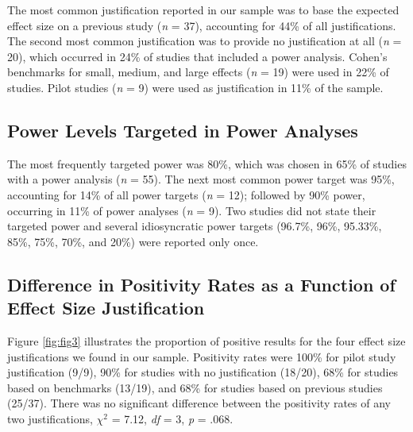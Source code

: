 \documentclass[
  man, donotrepeattitle,mask,floatsintext]{apa7}
\begin{document}
The most common justification reported in our sample was to base the expected effect size on a previous study (\emph{n} = 37), accounting for 44\% of all justifications. The second most common justification was to provide no justification at all (\emph{n} = 20), which occurred in 24\% of studies that included a power analysis. Cohen's benchmarks for small, medium, and large effects (\emph{n} = 19) were used in 22\% of studies. Pilot studies (\emph{n} = 9) were used as justification in 11\% of the sample.

\hypertarget{power-levels-targeted-in-power-analyses}{%
\subsection{Power Levels Targeted in Power Analyses}\label{power-levels-targeted-in-power-analyses}}

The most frequently targeted power was 80\%, which was chosen in 65\% of studies with a power analysis (\emph{n} = 55). The next most common power target was 95\%, accounting for 14\% of all power targets (\emph{n} = 12); followed by 90\% power, occurring in 11\% of power analyses (\emph{n} = 9). Two studies did not state their targeted power and several idiosyncratic power targets (96.7\%, 96\%, 95.33\%, 85\%, 75\%, 70\%, and 20\%) were reported only once.

\hypertarget{difference-in-positivity-rates-as-a-function-of-effect-size-justification}{%
\subsection{Difference in Positivity Rates as a Function of Effect Size Justification}\label{difference-in-positivity-rates-as-a-function-of-effect-size-justification}}

Figure \ref{fig:fig3} illustrates the proportion of positive results for the four effect size justifications we found in our sample. Positivity rates were 100\% for pilot study justification (9/9), 90\% for studies with no justification (18/20), 68\% for studies based on benchmarks (13/19), and 68\% for studies based on previous studies (25/37). There was no significant difference between the positivity rates of any two justifications, \(\chi^2\) = 7.12, \emph{df} = 3, \emph{p} = .068.

\pagebreak
\end{document}
